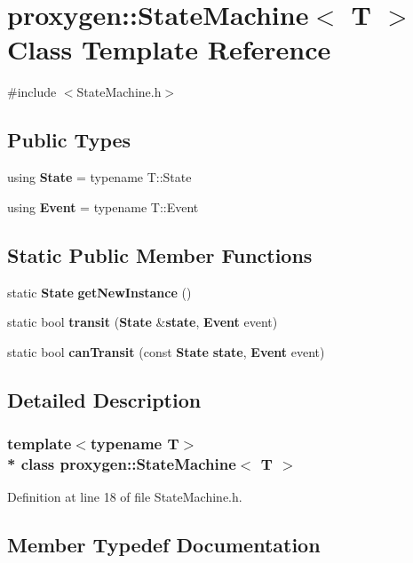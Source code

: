 \section{proxygen\+:\+:State\+Machine$<$ T $>$ Class Template Reference}
\label{classproxygen_1_1StateMachine}


{\ttfamily \#include $<$State\+Machine.\+h$>$}

\subsection*{Public Types}
\begin{DoxyCompactItemize}
\item 
using {\bf State} = typename T\+::\+State
\item 
using {\bf Event} = typename T\+::\+Event
\end{DoxyCompactItemize}
\subsection*{Static Public Member Functions}
\begin{DoxyCompactItemize}
\item 
static {\bf State} {\bf get\+New\+Instance} ()
\item 
static bool {\bf transit} ({\bf State} \&{\bf state}, {\bf Event} event)
\item 
static bool {\bf can\+Transit} (const {\bf State} {\bf state}, {\bf Event} event)
\end{DoxyCompactItemize}


\subsection{Detailed Description}
\subsubsection*{template$<$typename T$>$\\*
class proxygen\+::\+State\+Machine$<$ T $>$}



Definition at line 18 of file State\+Machine.\+h.



\subsection{Member Typedef Documentation}
